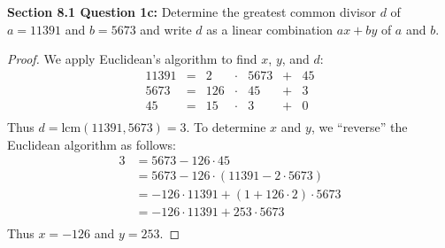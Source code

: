 \documentclass{article}
\begin{document}
\textbf{Section 8.1 Question 1c:} Determine the greatest common divisor $d$
  of $a=11391$ and $b=5673$ and write $d$ as a linear combination $ax+by$
  of $a$ and $b$.
  \begin{proof}
    We apply Euclidean's algorithm to find $x$, $y$, and $d$:
    \[\begin{array}{rcrcrcr}
      11391 &= &2   &\cdot &5673 &+ &45 \\
      5673  &= &126 &\cdot &45   &+ &3 \\
      45    &= &15  &\cdot &3    &+ &0 \\
    \end{array}\]
    Thus $d=\text{lcm}(11391,5673)=3$. To determine $x$ and $y$, we
    ``reverse'' the Euclidean algorithm as follows:
    \begin{align*}
      3 &=5673-126\cdot45 \\
        &=5673-126\cdot(11391-2\cdot5673) \\
        &=-126\cdot11391+(1+126\cdot2)\cdot5673 \\
        &=-126\cdot11391+253\cdot5673 \\
    \end{align*}
    Thus $x=-126$ and $y=253$.
  \end{proof}
\end{document}
